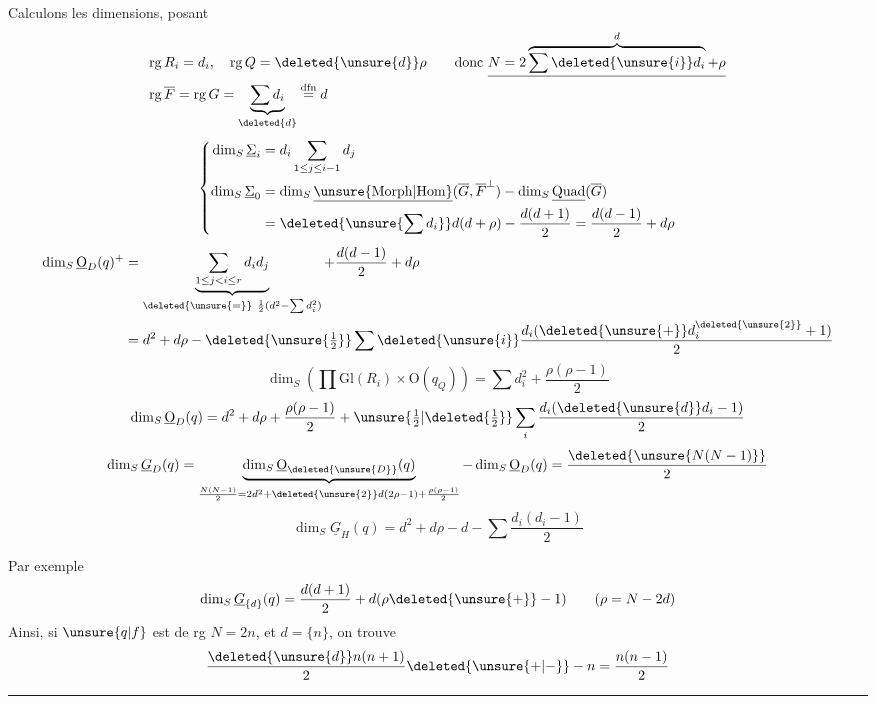 Calculons les dimensions, posant 
\[
\begin{aligned}
&\mathrm{rg}\,R_i=d_i,\quad \mathrm{rg}\,Q=\deleted{\unsure{d}}\rho
\qquad\text{donc }\underline{N=2\overbrace{\sum\deleted{\unsure{i}}d_i}^{d}+\rho}\\
&\mathrm{rg}\,\overline F=\mathrm{rg}\,G=\underbrace{\sum d_i}_{\deleted{d}}\overset{\mathrm{dfn}}{=}d
\end{aligned}
\]
\[
\left\{\begin{aligned}
\dim_S\underline\Sigma_i&=d_i\sum_{1\leq j\leq i-1}d_j\\
\dim_S\underline\Sigma_0&=\dim_S\underline{\unsure{\mathrm{Morph}|\mathrm{Hom}}}(\overline G,\overline F^\perp)-\dim_S\underline{\mathrm{Quad}}(\overline G)\\
&=\deleted{\unsure{\sum d_i}}d(d+\rho)-\frac{d(d+1)}{2}=\frac{d(d-1)}{2}+d\rho
\end{aligned}\right.
\]
\[
\begin{aligned}
\dim_S\underline{\mathrm O}_D(q)^+
 &=\underbrace{\sum_{1\leq j<i\leq r}d_i d_j}_{\deleted{\unsure{=}}\ \frac12(d^2-\sum d_i^2)}+\frac{d(d-1)}2+d\rho\\
 &=d^2+d\rho-\deleted{\unsure{\tfrac12}}\sum\deleted{\unsure{i}}\frac{d_i(\deleted{\unsure{+}}d_i^{\deleted{\unsure{2}}}+1)}2
\end{aligned}
\]
\[
\dim_S\left(\prod\mathrm{Gl}(R_i)\mathbin{\times}\mathrm O(q_Q)\right)=\sum d_i^2+\frac{\rho(\rho-1)}2
\]
\[
\dim_S\underline{\mathrm O}_D(q)=d^2+d\rho+\frac{\rho(\rho-1)}2+\unsure{\tfrac12|\deleted{\tfrac12}}\sum_i\frac{d_i(\deleted{\unsure{d}}d_i-1)}2
\]
\[
\dim_S\underline G_D(q)=
\underbrace{\dim_S\underline{\mathrm O}_{\deleted{\unsure{D}}}(q)}_{\frac{N(N-1)}2=2d^2+\deleted{\unsure{2}}d(2\rho-1)+\frac{\rho(\rho-1)}2}
-\dim_S\underline{\mathrm O}_D(q)=\frac{\deleted{\unsure{N(N-1)}}}{2}
\]
\[
\dim_S\underline G_H(q)=d^2+d\rho-d-\sum\frac{d_i(d_i-1)}2
\]

Par exemple
\[
\dim_S\underline G_{\{d\}}(q)=\frac{d(d+1)}{2}+d(\rho\deleted{\unsure{+}}-1)\qquad(\rho=N-2d)
\]
Ainsi, si $\unsure{q|f}$ est de rg $N=2n$, et $d=\{n\}$,  on trouve
\[
\frac{\deleted{\unsure{d}}n(n+1)}{2}\deleted{\unsure{+|-}}-n=\frac{n(n-1)}{2}
\]

\begin{center}\rule{.14\linewidth}{.4pt}\end{center}

